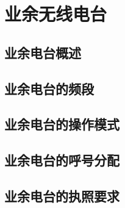 \documentclass[12pt,UTF8]{ctexbook}
\begin{document}
\chapter{业余无线电台}

\section{业余电台概述}

\section{业余电台的频段}

\section{业余电台的操作模式}

\section{业余电台的呼号分配}

\section{业余电台的执照要求}

\backmatter
\end{document}
